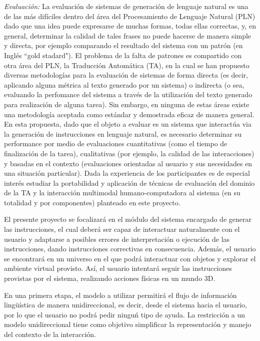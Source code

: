 \begin{myitemize}
\item \emph{Evaluaci\'on:} La evaluaci\'on de sistemas de generaci\'on de lenguaje natural es una de las m\'as dif\'iciles dentro del \'area del Procesamiento de Lenguaje Natural (PLN) dado que una idea puede expresarse de muchas formas, todas ellas correctas, y, en general, determinar la calidad de tales frases no puede hacerse de manera simple y directa, por ejemplo comparando el resultado del sistema con un patr\'on (en Ingl\'es ``gold stadard"). El problema de la falta de patrones es compartido con otra \'area del PLN, la Traducci\'on Autom\'atica (TA), en la cual se han propuesto diversas metodolog\'ias para la evaluaci\'on de sistemas de forma directa (es decir, aplicando alguna m\'etrica al texto generado por un sistema) o indirecta (o sea, evaluando la perfomance del sistema a trav\'es de la utilizaci\'on del texto generado para realizaci\'on de alguna tarea). Sin embargo, en ninguna de estas \'areas existe una metodolog\'ia aceptada como est\'andar y demostrada eficaz de manera general.
En esta propuesta, dado que el objeto a evaluar es un sistema que interact\'ua via la generaci\'on de instrucciones en lenguaje natural, es necesario determinar su performance por medio de evaluaciones cuantitativas (como el tiempo de finalizaci\'on de la tarea), cualitativas (por ejemplo, la calidad de las interacciones) y basadas en el contexto (evaluaciones orientadas al usuario y sus necesidades en una situaci\'on particular). Dada la experiencia de los participantes es de especial inter\'es estudiar la  portabilidad y aplicaci\'on de t\'ecnicas de evaluaci\'on del dominio de la TA y la interacci\'on multimodal humano-computadora al sistema (en su totalidad y por componentes) planteado en este proyecto.
\end{myitemize}

El presente proyecto se focalizar\'a en el  m\'odulo del sistema encargado de generar las instrucciones, el cual deber\'a ser capaz de interactuar naturalmente con el usuario y adaptarse a posibles errores de interpretaci\'on o ejecuci\'on de las instrucciones, dando instrucciones correctivas en consecuencia. Adem\'as, el usuario se encontrar\'a en un universo en el que podr\'a interactuar con objetos y explorar el ambiente virtual provisto. As\'i, el usuario intentar\'a seguir las instrucciones provistas por el sistema,
realizando acciones f\'isicas en un mundo 3D.


En una primera etapa, el modelo a utilizar permitir\'a el flujo de informaci\'on ling\"u\'istica de manera unidireccional, es decir,
desde el sistema hacia el usuario, por lo que
el usuario no podr\'a pedir ningu\'n tipo de ayuda.  La restricci\'on a un
modelo unidireccional tiene como objetivo
simplificar la representaci\'on y manejo del contexto de la interacci\'on.

